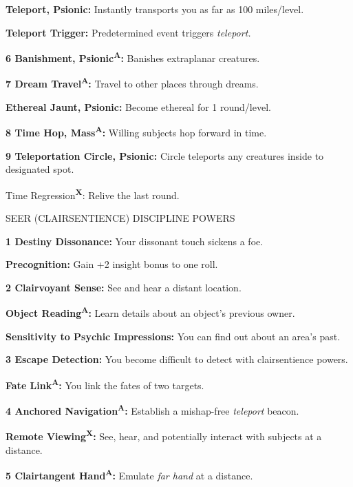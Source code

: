 \documentclass{article}
\begin{document}
\parindent=0pt
\textbf{Teleport, Psionic:} Instantly transports you as far as 100 miles/level.

\textbf{Teleport Trigger:} Predetermined event triggers \textit{teleport.}

\parindent=-15pt
\textbf{6 Banishment, Psionic}\textsuperscript{\textbf{A}}\textbf{:} Banishes extraplanar 
creatures.

\textbf{7 Dream Travel}\textsuperscript{\textbf{A}}\textbf{:} Travel to other places 
through dreams.

\parindent=0pt
\textbf{Ethereal Jaunt, Psionic:} Become ethereal for 1 round/level.

\parindent=-15pt
\textbf{8 Time Hop, Mass}\textsuperscript{\textbf{A}}\textbf{:} Willing subjects 
hop forward in time.

\textbf{9 Teleportation Circle, Psionic:} Circle teleports any creatures inside 
to designated spot.

\parindent=0pt
Time Regression\textsuperscript{\textbf{X}}: Relive the last round.

\vspace{12pt}
\parindent=-15pt
SEER (CLAIRSENTIENCE) DISCIPLINE POWERS

\textbf{1 Destiny Dissonance:} Your dissonant touch sickens a foe.

\parindent=0pt
\textbf{Precognition:} Gain +2 insight bonus to one roll.

\parindent=-15pt
\textbf{2 Clairvoyant Sense:} See and hear a distant location.

\parindent=0pt
\textbf{Object Reading}\textsuperscript{\textbf{A}}\textbf{:} Learn details about 
an object's previous owner.

\textbf{Sensitivity to Psychic Impressions:} You can find out about an area's past.

\parindent=-15pt
\textbf{3 Escape Detection:} You become difficult to detect with clairsentience 
powers.

\parindent=0pt
\textbf{Fate Link}\textsuperscript{\textbf{A}}\textbf{:} You link the fates of 
two targets. 

\parindent=-15pt
\textbf{4 Anchored Navigation}\textsuperscript{\textbf{A}}\textbf{:} Establish 
a mishap-free \textit{teleport }beacon.

\parindent=0pt
\textbf{Remote Viewing}\textsuperscript{\textbf{X}}\textbf{:} See, hear, and potentially 
interact with subjects at a distance.

\parindent=-15pt
\textbf{5 Clairtangent Hand}\textsuperscript{\textbf{A}}\textbf{:} Emulate \textit{far 
hand }at a distance.
\end{document}
